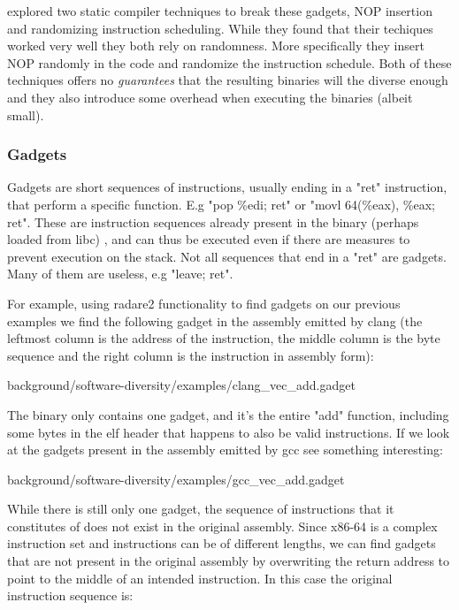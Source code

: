 \textcite{large-scale-automated} explored two static compiler techniques to break these
gadgets, NOP insertion and randomizing instruction scheduling. While they found that their
techiques worked very well they both rely on randomness. More specifically they insert
NOP randomly in the code and randomize the instruction schedule. Both of these techniques
offers no \textit{guarantees} that the resulting binaries will the diverse enough and they
also introduce some overhead when executing the binaries (albeit small).

\subsubsection{Gadgets}
Gadgets are short sequences of instructions, usually ending in a "ret" instruction, that
perform a specific function. E.g "pop \%edi; ret" or "movl 64(\%eax), \%eax; ret". \cite{rop}
These are instruction sequences already present in the binary (perhaps loaded from libc)
, and can thus be executed even if there are measures to prevent execution on the stack.
Not all sequences that end in a "ret" are gadgets. Many of them are useless, e.g "leave;
ret".

For example, using radare2 functionality to find gadgets on our previous examples we find
the following gadget in the assembly emitted by clang (the leftmost column is the address
of the instruction, the middle column is the byte sequence and  the right column is the
instruction in assembly form):


{background/software-diversity/examples/clang_vec_add.gadget}

The binary only contains one gadget, and it's the entire "add" function, including some
bytes in the elf header that happens to also be valid instructions. If we look at the
gadgets present in the assembly emitted by gcc see something interesting:


{background/software-diversity/examples/gcc_vec_add.gadget}

While there is still only one gadget, the sequence of instructions that it constitutes of
does not exist in the original assembly. Since x86-64 is a complex instruction set and
instructions can be of different lengths, we can find gadgets that are not present in the
original assembly by overwriting the return address to point to the middle of an intended
instruction. In this case the original instruction sequence is:

